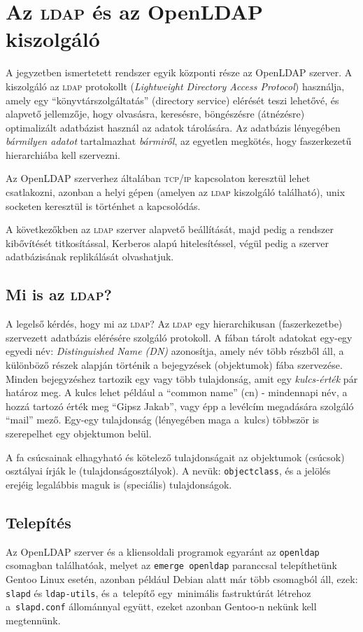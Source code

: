 \chapter{Az \textsc{ldap} és az OpenLDAP kiszolgáló}

A jegyzetben ismertetett rendszer egyik központi része az OpenLDAP szerver. A kiszolgáló az \textsc{ldap} protokollt
({\em Lightweight Directory Access Protocol}) használja, amely egy ``könyvtárszolgáltatás'' (directory service) elérését
teszi lehetővé, és alapvető jellemzője, hogy olvasásra, keresésre, böngészésre (átnézésre)
optimalizált adatbázist használ az adatok tárolására. Az adatbázis lényegében \emph{bármilyen adatot} tartalmazhat
\emph{bármiről}, az egyetlen megkötés, hogy faszerkezetű hierarchiába kell szervezni.

Az OpenLDAP szerverhez általában \textsc{tcp}/\textsc{ip} kapcsolaton keresztül lehet csatlakozni, azonban a helyi gépen (amelyen az
\textsc{ldap} kiszolgáló található), unix socketen keresztül is történhet a kapcsolódás.

A következőkben az \textsc{ldap} szerver alapvető beállítását, majd pedig a rendszer kibővítését titkosítással,
Kerberos alapú hitelesítéssel, végül pedig a szerver adatbázisának replikálását olvashatjuk.

\section{Mi is az \textsc{ldap}?}

A legelső kérdés, hogy mi az \textsc{ldap}?
Az \textsc{ldap} egy hierarchikusan (faszerkezetbe) szervezett adatbázis elérésére szolgáló protokoll. A fában tárolt
adatokat
egy-egy egyedi név: {\em Distinguished Name (DN)} azonosítja, amely név több részből áll, a  különböző részek alapján
történik a bejegyzések (objektumok) fába szervezése. Minden bejegyzéshez tartozik egy vagy több
tulajdonság, amit egy {\em kulcs-érték} pár határoz meg. A kulcs lehet például a ``common name'' (cn) - mindennapi
név, a hozzá tartozó érték meg ``Gipsz Jakab'', vagy épp a levélcím megadására szolgáló ``mail'' mező. Egy-egy
tulajdonság (lényegében maga a~kulcs) többször is szerepelhet egy objektumon belül.

A fa csúcsainak elhagyható és kötelező tulajdonságait az objektumok (csúcsok) osztályai írják le
(tulajdonságosztályok). A nevük: \texttt{objectclass}, és a jelölés erejéig legalábbis  maguk is (speciális)
tulajdonságok.


\section{Telepítés}
Az OpenLDAP szerver és a kliensoldali programok egyaránt az \texttt{openldap} csomagban találhatóak, melyet az
\texttt{emerge openldap} paranccsal telepíthetünk Gentoo Linux esetén, azonban például Debian alatt már több csomagból
áll, ezek: \texttt{slapd} és \texttt{ldap-utils}, és a~telepítő egy~minimális fastruktúrát létrehoz a~\texttt{slapd.conf}
állománnyal együtt, ezeket azonban Gentoo-n nekünk kell megtennünk.

